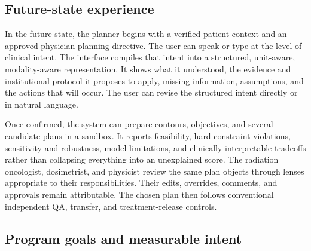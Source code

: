 \documentclass[11pt,letterpaper]{article}
\begin{document}
\subsection{Future-state experience}

In the future state, the planner begins with a verified patient context and an approved physician planning directive. The user can speak or type at the level of clinical intent. The interface compiles that intent into a structured, unit-aware, modality-aware representation. It shows what it understood, the evidence and institutional protocol it proposes to apply, missing information, assumptions, and the actions that will occur. The user can revise the structured intent directly or in natural language.

Once confirmed, the system can prepare contours, objectives, and several candidate plans in a sandbox. It reports feasibility, hard-constraint violations, sensitivity and robustness, model limitations, and clinically interpretable tradeoffs rather than collapsing everything into an unexplained score. The radiation oncologist, dosimetrist, and physicist review the same plan objects through lenses appropriate to their responsibilities. Their edits, overrides, comments, and approvals remain attributable. The chosen plan then follows conventional independent QA, transfer, and treatment-release controls.

\subsection{Program goals and measurable intent}
\end{document}
